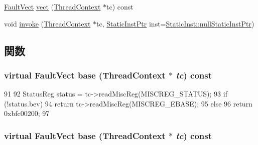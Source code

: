 \begin{DoxyCompactItemize}
\item 
\hyperlink{classm5_1_1params_1_1Addr}{FaultVect} \hyperlink{classMipsISA_1_1MipsFaultBase_a1052109661a1cc9f7847b80b8b98450b}{vect} (\hyperlink{classThreadContext}{ThreadContext} $\ast$tc) const 
\item 
void \hyperlink{classMipsISA_1_1MipsFaultBase_a2bd783b42262278d41157d428e1f8d6f}{invoke} (\hyperlink{classThreadContext}{ThreadContext} $\ast$tc, \hyperlink{classRefCountingPtr}{StaticInstPtr} inst=\hyperlink{classStaticInst_aa793d9793af735f09096369fb17567b6}{StaticInst::nullStaticInstPtr})
\end{DoxyCompactItemize}


\subsection{関数}
\hypertarget{classMipsISA_1_1MipsFaultBase_aeffc2acfc2e831414e517e76995fc6d5}{
\subsubsection[{base}]{\setlength{\rightskip}{0pt plus 5cm}virtual {\bf FaultVect} base ({\bf ThreadContext} $\ast$ {\em tc}) const}}
\label{classMipsISA_1_1MipsFaultBase_aeffc2acfc2e831414e517e76995fc6d5}



\begin{DoxyCode}
91     {
92         StatusReg status = tc->readMiscReg(MISCREG_STATUS);
93         if (!status.bev)
94             return tc->readMiscReg(MISCREG_EBASE);
95         else
96             return 0xbfc00200;
97     }
\end{DoxyCode}
\hypertarget{classMipsISA_1_1MipsFaultBase_aeffc2acfc2e831414e517e76995fc6d5}{
\subsubsection[{base}]{\setlength{\rightskip}{0pt plus 5cm}virtual {\bf FaultVect} base ({\bf ThreadContext} $\ast$ {\em tc}) const}}
\label{classMipsISA_1_1MipsFaultBase_aeffc2acfc2e831414e517e76995fc6d5}



